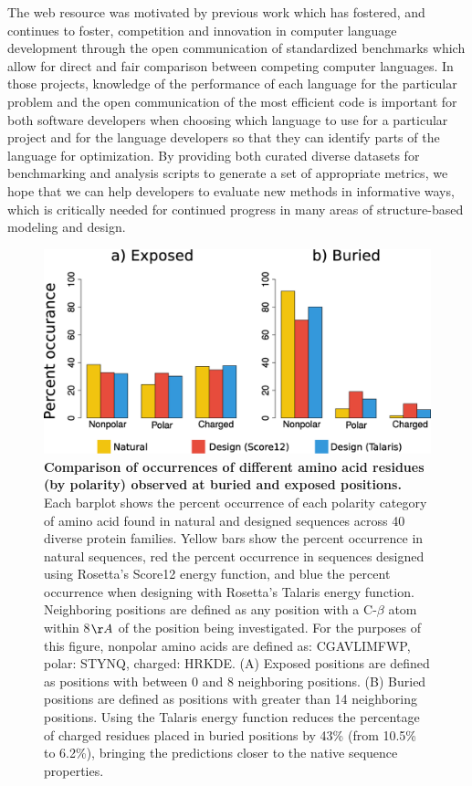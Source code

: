 The web resource was motivated by previous work \cite{bagley_d_computer_2004,calpini_a_great_2003} which has fostered, and continues to foster, competition and innovation in computer language development through the open communication of standardized benchmarks which allow for direct and fair comparison between competing computer languages. In those projects, knowledge of the performance of each language for the particular problem and the open communication of the most efficient code is important for both software developers when choosing which language to use for a particular project and for the language developers so that they can identify parts of the language for optimization. By providing both curated diverse datasets for benchmarking and analysis scripts to generate a set of appropriate metrics, we hope that we can help developers to evaluate new methods in informative ways, which is critically needed for continued progress in many areas of structure-based modeling and design.

\begin{figure}[H]
  \centering
  \includegraphics[width=\textwidth,keepaspectratio]{figures/benchmark-fig-s1.eps}
  \caption[Comparison of occurrences of different amino acid residues (by polarity) observed at buried and exposed positions]{
    \textbf{Comparison of occurrences of different amino acid residues (by polarity) observed at buried and exposed positions.}
    Each barplot shows the percent occurrence of each polarity category of amino acid found in natural and designed sequences across 40 diverse protein families. Yellow bars show the percent occurrence in natural sequences, red the percent occurrence in sequences designed using Rosetta’s Score12 energy function, and blue the percent occurrence when designing with Rosetta’s Talaris energy function. Neighboring positions are defined as any position with a C-$\beta$ atom within 8$\AA$ of the position being investigated. For the purposes of this figure, nonpolar amino acids are defined as: CGAVLIMFWP, polar: STYNQ, charged: HRKDE. (A) Exposed positions are defined as positions with between 0 and 8 neighboring positions. (B) Buried positions are defined as positions with greater than 14 neighboring positions. Using the Talaris energy function reduces the percentage of charged residues placed in buried positions by 43\% (from 10.5\% to 6.2\%), bringing the predictions closer to the native sequence properties.
  }
  \label{fig:benchmark-burial-exposed}
\end{figure}

